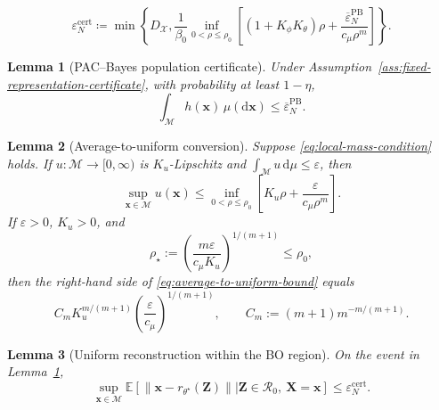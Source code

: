 \documentclass[10pt,a4paper]{amsart}
\newtheorem{lemma}{Lemma}
\begin{document}
\begin{equation}
  \varepsilon_N^{\mathrm{cert}}
   \coloneq \min\left\{
    D_{\mathcal{X}},
    \frac{1}{\beta_0}
    \inf_{0<\rho\leq\rho_0}
    \left[
      (1+K_\phi K_\theta)\rho
      +\frac{\overline\varepsilon_N^{\mathrm{PB}}}
             {c_\mu\rho^m}
    \right]
  \right\}.
  \label{eq:uniform-reconstruction-certificate}
\end{equation}

\begin{lemma}[PAC--Bayes population certificate]
\label{lem:pac-bayes-population-certificate}
Under Assumption~\ref{ass:fixed-representation-certificate}, with probability
at least $1-\eta$,
\begin{equation}
  \int_{\mathcal{M}}h(\mathbf{x})\,\mu(\mathrm d\mathbf{x})
  \leq \overline\varepsilon_N^{\mathrm{PB}}.
  \label{eq:population-reconstruction-bound}
\end{equation}
\end{lemma}

\begin{lemma}[Average-to-uniform conversion]
\label{lem:average-to-uniform}
Suppose \eqref{eq:local-mass-condition} holds.  If $u:\mathcal{M}\to[0,\infty)$ is $K_u$-Lipschitz and $\int_{\mathcal{M}}u\,\mathrm d\mu\leq\varepsilon$, then 
\begin{equation}
  \sup_{\mathbf{x}\in\mathcal{M}}u(\mathbf{x})
  \leq
  \inf_{0<\rho\leq\rho_0}
  \left[K_u\rho+\frac{\varepsilon}{c_\mu\rho^m}\right].
  \label{eq:average-to-uniform-bound}
\end{equation}
If $\varepsilon>0$, $K_u>0$, and
\begin{equation}
  \rho_\star
  :=\left(\frac{m\varepsilon}{c_\mu K_u}\right)^{1/(m+1)}
  \leq\rho_0,
  \label{eq:optimal-local-radius}
\end{equation}
then the right-hand side of \eqref{eq:average-to-uniform-bound} equals
\begin{equation}
  C_m K_u^{m/(m+1)}
  \left(\frac{\varepsilon}{c_\mu}\right)^{1/(m+1)},
  \qquad
  C_m:=(m+1)m^{-m/(m+1)}.
  \label{eq:average-to-uniform-closed-form}
\end{equation}
\end{lemma}

\begin{lemma}[Uniform reconstruction within the BO region]
\label{lem:uniform-reconstruction-in-region}
On the event in Lemma~\ref{lem:pac-bayes-population-certificate},
\begin{equation}
  \sup_{\mathbf{x}\in\mathcal{M}}
  \mathbb{E}\!\left[
    \|\mathbf{x}-r_{\theta^\star}(\mathbf{Z})\|
    \mathrel{\big|} \mathbf{Z}\in\mathcal{R}_0,\ \mathbf{X}=\mathbf{x}
  \right]
  \leq \varepsilon_N^{\mathrm{cert}}.
  \label{eq:conditional-uniform-reconstruction}
\end{equation}
\end{lemma}
\end{document}
